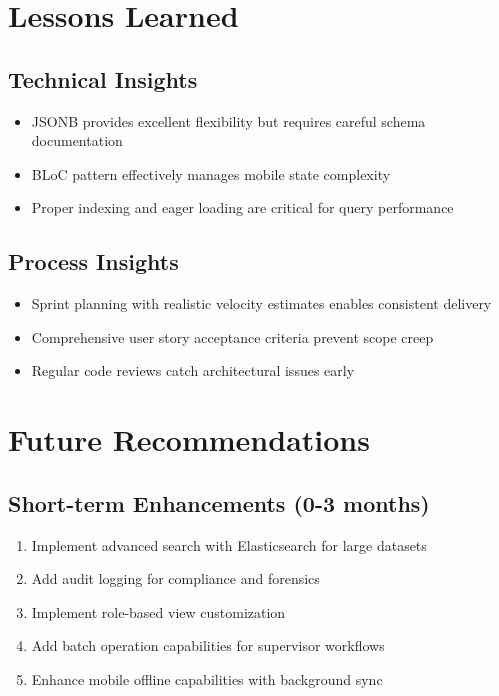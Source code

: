 \section*{Lessons Learned}

\subsection*{Technical Insights}

\begin{itemize}
\item JSONB provides excellent flexibility but requires careful schema documentation
\item BLoC pattern effectively manages mobile state complexity
\item Proper indexing and eager loading are critical for query performance
\end{itemize}

\subsection*{Process Insights}

\begin{itemize}
\item Sprint planning with realistic velocity estimates enables consistent delivery
\item Comprehensive user story acceptance criteria prevent scope creep
\item Regular code reviews catch architectural issues early
\end{itemize}

\section*{Future Recommendations}

\subsection*{Short-term Enhancements (0-3 months)}

\begin{enumerate}
\item Implement advanced search with Elasticsearch for large datasets
\item Add audit logging for compliance and forensics
\item Implement role-based view customization
\item Add batch operation capabilities for supervisor workflows
\item Enhance mobile offline capabilities with background sync
\end{enumerate}

